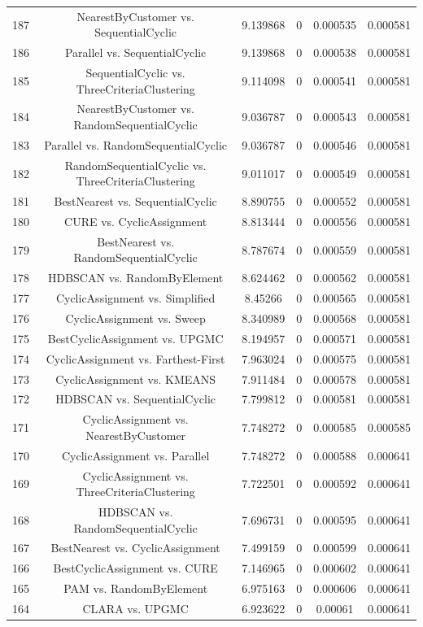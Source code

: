 \documentclass[a4paper,10pt]{article}
\begin{document}
\begin{landscape}
\begin{table}[!htp]
\begin{tabular}{cccccc}
187&NearestByCustomer vs. SequentialCyclic&9.139868&0&0.000535&0.000581\\
186&Parallel vs. SequentialCyclic&9.139868&0&0.000538&0.000581\\
185&SequentialCyclic vs. ThreeCriteriaClustering&9.114098&0&0.000541&0.000581\\
184&NearestByCustomer vs. RandomSequentialCyclic&9.036787&0&0.000543&0.000581\\
183&Parallel vs. RandomSequentialCyclic&9.036787&0&0.000546&0.000581\\
182&RandomSequentialCyclic vs. ThreeCriteriaClustering&9.011017&0&0.000549&0.000581\\
181&BestNearest vs. SequentialCyclic&8.890755&0&0.000552&0.000581\\
180&CURE vs. CyclicAssignment&8.813444&0&0.000556&0.000581\\
179&BestNearest vs. RandomSequentialCyclic&8.787674&0&0.000559&0.000581\\
178&HDBSCAN vs. RandomByElement&8.624462&0&0.000562&0.000581\\
177&CyclicAssignment vs. Simplified&8.45266&0&0.000565&0.000581\\
176&CyclicAssignment vs. Sweep&8.340989&0&0.000568&0.000581\\
175&BestCyclicAssignment vs. UPGMC&8.194957&0&0.000571&0.000581\\
174&CyclicAssignment vs. Farthest-First&7.963024&0&0.000575&0.000581\\
173&CyclicAssignment vs. KMEANS&7.911484&0&0.000578&0.000581\\
172&HDBSCAN vs. SequentialCyclic&7.799812&0&0.000581&0.000581\\
171&CyclicAssignment vs. NearestByCustomer&7.748272&0&0.000585&0.000585\\
170&CyclicAssignment vs. Parallel&7.748272&0&0.000588&0.000641\\
169&CyclicAssignment vs. ThreeCriteriaClustering&7.722501&0&0.000592&0.000641\\
168&HDBSCAN vs. RandomSequentialCyclic&7.696731&0&0.000595&0.000641\\
167&BestNearest vs. CyclicAssignment&7.499159&0&0.000599&0.000641\\
166&BestCyclicAssignment vs. CURE&7.146965&0&0.000602&0.000641\\
165&PAM vs. RandomByElement&6.975163&0&0.000606&0.000641\\
164&CLARA vs. UPGMC&6.923622&0&0.00061&0.000641\\

\end{tabular}
\end{table}
\end{landscape}
\end{document}

